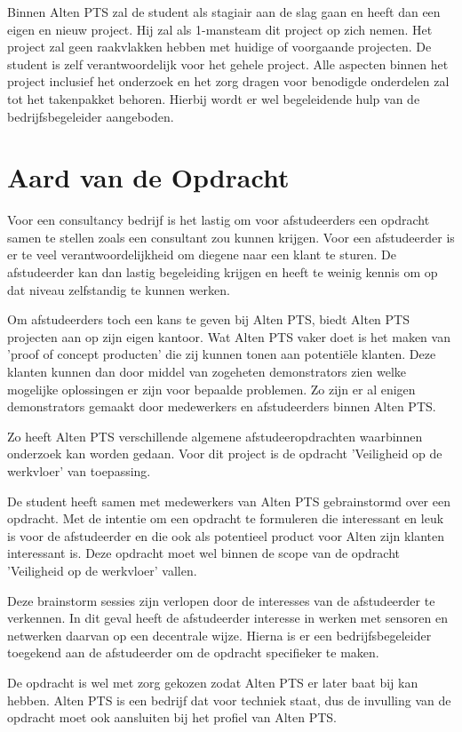 \documentclass{../local}
\begin{document}
Binnen Alten PTS zal de student als stagiair aan de slag gaan en heeft dan een eigen en nieuw project. Hij zal als 1-mansteam dit project op zich nemen. Het project zal geen raakvlakken hebben met huidige of voorgaande projecten. De student is zelf verantwoordelijk voor het gehele project. Alle aspecten binnen het project inclusief het onderzoek en het zorg dragen voor benodigde onderdelen zal tot het takenpakket behoren. Hierbij wordt er wel begeleidende hulp van de bedrijfsbegeleider aangeboden.

\section{Aard van de Opdracht}

Voor een consultancy bedrijf is het lastig om voor afstudeerders een opdracht samen te stellen zoals een consultant zou kunnen krijgen. Voor een afstudeerder is er te veel verantwoordelijkheid om diegene naar een klant te sturen. De afstudeerder kan dan lastig begeleiding krijgen en heeft te weinig kennis om op dat niveau zelfstandig te kunnen werken.

Om afstudeerders toch een kans te geven bij Alten PTS, biedt Alten PTS projecten aan op zijn eigen kantoor. Wat Alten PTS vaker doet is het maken van 'proof of concept producten' die zij kunnen tonen aan potentiële klanten. Deze klanten kunnen dan door middel van zogeheten demonstrators zien welke mogelijke oplossingen er zijn voor bepaalde problemen. Zo zijn er al enigen demonstrators gemaakt door medewerkers en afstudeerders binnen Alten PTS.

Zo heeft Alten PTS verschillende algemene afstudeeropdrachten waarbinnen onderzoek kan worden gedaan. Voor dit project is de opdracht 'Veiligheid op de werkvloer' van toepassing.

De student heeft samen met medewerkers van Alten PTS gebrainstormd over een opdracht. Met de intentie om een opdracht te formuleren die interessant en leuk is voor de afstudeerder en die ook als potentieel product voor Alten zijn klanten interessant is. Deze opdracht moet wel binnen de scope van de opdracht 'Veiligheid op de werkvloer' vallen.

Deze brainstorm sessies zijn verlopen door de interesses van de afstudeerder te verkennen. In dit geval heeft de afstudeerder interesse in werken met sensoren en netwerken daarvan op een decentrale wijze. Hierna is er een bedrijfsbegeleider toegekend aan de afstudeerder om de opdracht specifieker te maken.

De opdracht is wel met zorg gekozen zodat Alten PTS er later baat bij kan hebben. Alten PTS is een bedrijf dat voor techniek staat, dus de invulling van de opdracht moet ook aansluiten bij het profiel van Alten PTS.
\end{document}
